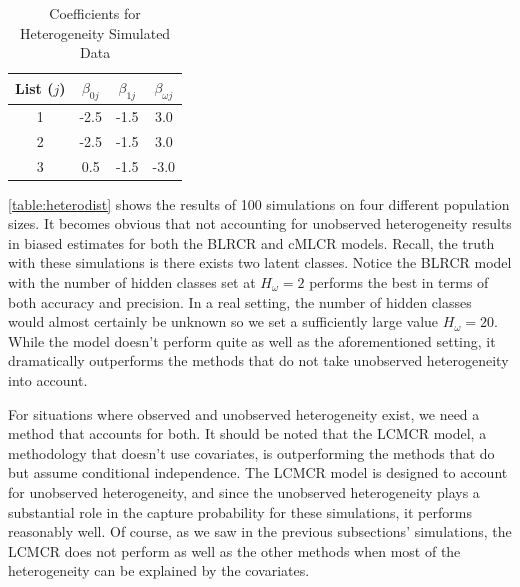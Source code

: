 \documentclass[
  12pt,
]{article}
\begin{document}
\singlespacing
\begin{table}[H]
\centering
\begin{tabular}{||c c c c||} 
 \hline
 List ($j$) & $\beta_{0j}$ & $\beta_{1j}$ & $\beta_{\omega j}$   \\ [0.5ex] 
 \hline\hline
 1 & -2.5 &  -1.5  & 3.0 \\ 
 2 & -2.5 & -1.5  &  3.0 \\
 3 & 0.5 & -1.5  &  -3.0 \\
 \hline
\end{tabular}
\caption{Coefficients for Heterogeneity Simulated Data}
\label{table:heterocoefs}
\end{table}
\doublespacing

\autoref{table:heterodist} shows the results of 100 simulations on four
different population sizes. It becomes obvious that not accounting for
unobserved heterogeneity results in biased estimates for both the BLRCR
and cMLCR models. Recall, the truth with these simulations is there
exists two latent classes. Notice the BLRCR model with the number of
hidden classes set at \(H_\omega=2\) performs the best in terms of both
accuracy and precision. In a real setting, the number of hidden classes
would almost certainly be unknown so we set a sufficiently large value
\(H_\omega=20\). While the model doesn't perform quite as well as the
aforementioned setting, it dramatically outperforms the methods that do
not take unobserved heterogeneity into account.

For situations where observed and unobserved heterogeneity exist, we
need a method that accounts for both. It should be noted that the LCMCR
model, a methodology that doesn't use covariates, is outperforming the
methods that do but assume conditional independence. The LCMCR model is
designed to account for unobserved heterogeneity, and since the
unobserved heterogeneity plays a substantial role in the capture
probability for these simulations, it performs reasonably well. Of
course, as we saw in the previous subsections' simulations, the LCMCR
does not perform as well as the other methods when most of the
heterogeneity can be explained by the covariates.
\end{document}
